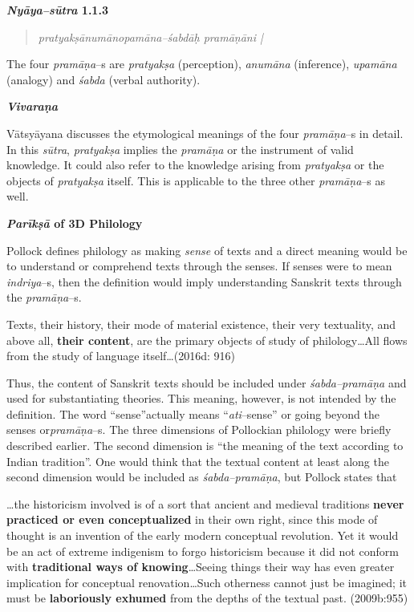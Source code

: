 \textbf{\textit{Nyāya–sūtra} 1.1.3}

\begin{verse}
\textit{pratyakṣānumānopamāna–śabdāḥ pramāṇāni |}
\end{verse}

The four \textit{pramāṇa}–s are \textit{pratyakṣa }(perception), \textit{anumāna} (inference), \textit{upamāna} (analogy) and \textit{śabda }(verbal authority).

\textit{\textbf{Vivaraṇa}}

Vātsyāyana discusses the etymological meanings of the four \textit{pramāṇa}–s in detail. In this \textit{sūtra}, \textit{pratyakṣa} implies the \textit{pramāṇa} or the instrument of valid knowledge. It could also refer to the knowledge arising from \textit{pratyakṣa} or the objects of \textit{pratyakṣa} itself. This is applicable to the three other \textit{pramāṇa}–s as well.

\textbf{\textit{Parīkṣā} of 3D Philology}

Pollock defines philology as making \textit{sense} of texts and a direct meaning would be to understand or comprehend texts through the senses. If senses were to mean \textit{indriya}–s, then the definition would imply understanding Sanskrit texts through the\textit{ pramāṇa}–s.

\begin{myquote}
Texts, their history, their mode of material existence, their very textuality, and above all, \textbf{their content}, are the primary objects of study of philology…All flows from the study of language itself…(2016d: 916)
\end{myquote}

Thus, the content of Sanskrit texts should be included under \textit{śabda–pramāṇa} and used for substantiating theories. This meaning, however, is not intended by the definition. The word “sense”actually means “\textit{ati}–sense” or going beyond the senses or\textit{pramāṇa}–s. The three dimensions of Pollockian philology were briefly described earlier. The second dimension is “the meaning of the text according to Indian tradition”. One would think that the textual content at least along the second dimension would be included as \textit{śabda–pramāṇa}, but Pollock states that

\begin{myquote}
…the historicism involved is of a sort that ancient and medieval traditions \textbf{never practiced or even conceptualized }in their own right, since this mode of thought is an invention of the early modern conceptual revolution. Yet it would be an act of extreme indigenism to forgo historicism because it did not conform with \textbf{traditional ways of knowing}…Seeing things their way has even greater implication for conceptual renovation…Such otherness cannot just be imagined; it must be\textbf{ laboriously exhumed} from the depths of the textual past. (2009b:955)
\end{myquote}

